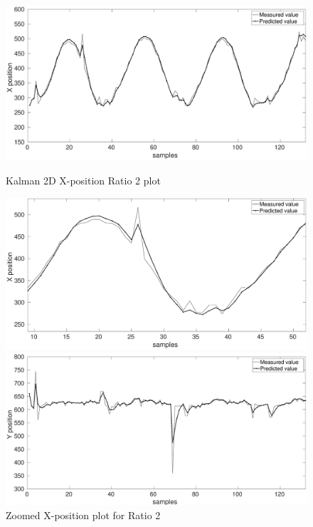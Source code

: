 \documentclass[12pt]{article}
\begin{document}
\begin{figure}[h]
\centering
\begin{minipage}{0.5\textwidth}
\centering
	\includegraphics[width = \textwidth]{./Figures/part2Ratio2X.eps}
	\caption{Kalman 2D X-position Ratio 2 plot }
	\label{fig:kalman 2D XRat2}
\end{minipage}%
\begin{minipage}{0.5\textwidth}
\centering
	\includegraphics[width = \textwidth]{./Figures/part2Ratio2Xzoomed.eps}
	\caption{ Zoomed X-position plot for Ratio 2}
	\label{fig: kalman 2D XRat2 zoom}
\end{minipage}
\begin{minipage}{0.5\textwidth}
\centering
	\includegraphics[width = \textwidth]{./Figures/part2Ratio2Y.eps}

\end{minipage}
\end{figure}
\end{document}
